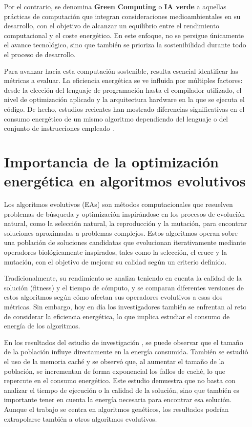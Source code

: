 Por el contrario, se denomina \textbf{Green Computing} o \textbf{IA verde} a aquellas prácticas de computación que integran consideraciones medioambientales en su desarrollo, con el objetivo de alcanzar un equilibrio entre el rendimiento computacional y el coste energético. En este enfoque, no se persigue únicamente el avance tecnológico, sino que también se prioriza la sostenibilidad durante todo el proceso de desarrollo. \cite{zhou2023opportunities}

Para avanzar hacia esta computación sostenible, resulta esencial identificar las métricas a evaluar. La eficiencia energética se ve influida por múltiples factores: desde la elección del lenguaje de programación hasta el compilador utilizado, el nivel de optimización aplicado y la arquitectura hardware en la que se ejecuta el código. De hecho, estudios recientes han mostrado diferencias significativas en el consumo energético de un mismo algoritmo dependiendo del lenguaje o del conjunto de instrucciones empleado \cite{lutz2021energy}.

\section{Importancia de la optimización energética en algoritmos evolutivos}

Los algoritmos evolutivos (EAs) son métodos computacionales que resuelven problemas de búsqueda y optimización inspirándose en los procesos de evolución natural, como la selección natural, la reproducción y la mutación, para encontrar soluciones aproximadas a problemas complejos. Estos algoritmos operan sobre una población de soluciones candidatas que evolucionan iterativamente mediante operadores biológicamente inspirados, tales como la selección, el cruce y la mutación, con el objetivo de mejorar su calidad según un criterio definido.

Tradicionalmente, su rendimiento se analiza teniendo en cuenta la calidad de la solución (fitness) y el tiempo de cómputo, y se comparan diferentes versiones de estos algoritmos según cómo afectan sus operadores evolutivos a esas dos métricas. Sin embargo, hoy en día los investigadores también se enfrentan al reto de considerar la eficiencia energética, lo que implica estudiar el consumo de energía de los algoritmos.

En los resultados del estudio de investigación \cite{diaz2022population}, se puede observar que el tamaño de la población influye directamente en la energía consumida. También se estudió el uso de la memoria caché y se observó que, al aumentar el tamaño de la población, se incrementan de forma exponencial los fallos de caché, lo que repercute en el consumo energético. Este estudio demuestra que no basta con analizar el tiempo de ejecución o la calidad de la solución, sino que también es importante tener en cuenta la energía necesaria para encontrar esa solución. Aunque el trabajo se centra en algoritmos genéticos, los resultados podrían extrapolarse también a otros algoritmos evolutivos.

